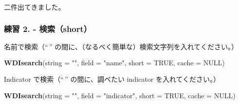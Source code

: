 \documentclass[
  xelatex, ja=standard]{bxjsbook}
\newenvironment{Shaded}{\begin{snugshade}}{\end{snugshade}}
\newcommand{\AttributeTok}[1]{\textcolor[rgb]{0.13,0.29,0.53}{#1}}
\newcommand{\CommentTok}[1]{\textcolor[rgb]{0.56,0.35,0.01}{\textit{#1}}}
\newcommand{\ConstantTok}[1]{\textcolor[rgb]{0.56,0.35,0.01}{#1}}
\newcommand{\FunctionTok}[1]{\textcolor[rgb]{0.13,0.29,0.53}{\textbf{#1}}}
\newcommand{\NormalTok}[1]{#1}
\newcommand{\StringTok}[1]{\textcolor[rgb]{0.31,0.60,0.02}{#1}}
\theoremstyle{definition}
\theoremstyle{definition}
\theoremstyle{definition}
\theoremstyle{definition}
\theoremstyle{remark}
\begin{document}
\begin{Shaded}
\end{Shaded}

二件出てきました。

\hypertarget{ux7df4ux7fd2-2.---ux691cux7d22short}{%
\subsubsection{練習 2. - 検索（short）}\label{ux7df4ux7fd2-2.---ux691cux7d22short}}

名前で検索（``\,'' の間に、（なるべく簡単な）検索文字列を入れてください。）

\begin{Shaded}
\begin{Highlighting}[]
\FunctionTok{WDIsearch}\NormalTok{(}\AttributeTok{string =} \StringTok{""}\NormalTok{, }\AttributeTok{field =} \StringTok{"name"}\NormalTok{, }\AttributeTok{short =} \ConstantTok{TRUE}\NormalTok{, }\AttributeTok{cache =} \ConstantTok{NULL}\NormalTok{)}
\end{Highlighting}
\end{Shaded}

Indicator で検索（``\,'' の間に、調べたい indicator を入れてください。）

\begin{Shaded}
\begin{Highlighting}[]
\FunctionTok{WDIsearch}\NormalTok{(}\AttributeTok{string =} \StringTok{""}\NormalTok{, }\AttributeTok{field =} \StringTok{"indicator"}\NormalTok{, }\AttributeTok{short =} \ConstantTok{TRUE}\NormalTok{, }\AttributeTok{cache =} \ConstantTok{NULL}\NormalTok{)}
\end{Highlighting}
\end{Shaded}
\end{document}
